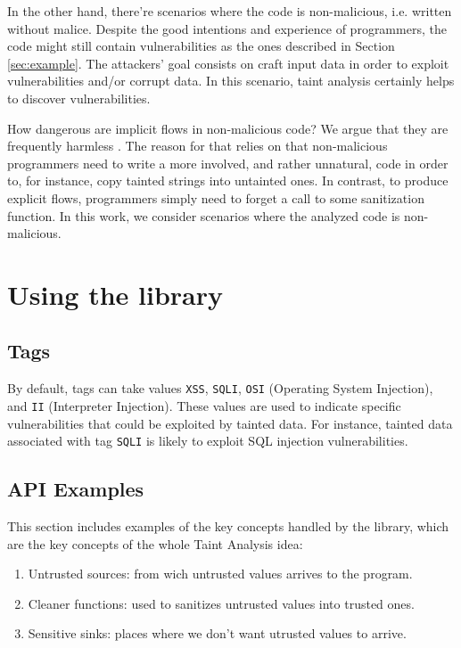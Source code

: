 In the other hand, there're scenarios where 
the code is non-malicious, i.e. written without malice. 
Despite the good intentions and experience of programmers, 
the code might still contain vulnerabilities 
as the ones
described in Section \ref{sec:example}. The attackers' goal  
consists on craft input data in order to exploit 
vulnerabilities and/or corrupt data. In this scenario,
taint analysis certainly helps to discover vulnerabilities. 

How dangerous are implicit flows in non-malicious code? We argue that they
are frequently harmless \cite{Russo:IOS}. The reason for that 
relies on that non-malicious programmers
need to write a more involved, and rather unnatural,
code in order to, for instance, copy tainted strings into untainted ones. 
In contrast, to produce explicit flows, programmers simply
need to forget a call to some sanitization function. 
In this work, we consider 
scenarios where the analyzed code is non-malicious. 



\section{Using the library}

\subsection*{Tags}

By default, tags can take values  
\texttt{XSS}, \texttt{SQLI}, \texttt{OSI} (Operating System Injection), and
\texttt{II} (Interpreter Injection).
These values are used to indicate specific vulnerabilities that 
could be exploited by tainted data.
For instance, 
tainted data associated with tag \texttt{SQLI} is likely to exploit 
SQL injection vulnerabilities.

\subsection*{API Examples}
This section %
includes examples of the key concepts handled by the library,
which are the key concepts of the whole Taint Analysis idea:

\begin{enumerate}
\item Untrusted sources: from wich untrusted values arrives to the program.
\item Cleaner functions: used to sanitizes untrusted values into trusted ones.
\item Sensitive sinks: places where we don't want utrusted values to arrive.
\end{enumerate}

